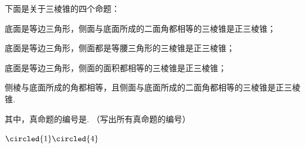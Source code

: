 \begin{problem}
下面是关于三棱锥的四个命题：

\begin{circlelist}
\item 底面是等边三角形，侧面与底面所成的二面角都相等的三棱锥是正三棱锥；
\item 底面是等边三角形，侧面都是等腰三角形的三棱锥是正三棱锥；
\item 底面是等边三角形，侧面的面积都相等的三棱锥是正三棱锥；
\item 侧棱与底面所成的角都相等，且侧面与底面所成的二面角都相等的三棱锥是正三棱锥.
\end{circlelist}

其中，真命题的编号是\fillinblank{}. （写出所有真命题的编号）
\end{problem}

\begin{answer}\(\circled{1}\circled{4}\)\end{answer}

